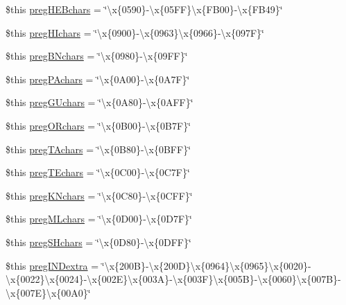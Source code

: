 \begin{DoxyCompactItemize}
\item 
\$this \hyperlink{config_8php_a92662e0d06763e04a021074b8e0dccc2}{preg\-H\-E\-Bchars} = \char`\"{}\textbackslash{}x\{0590\}-\/\textbackslash{}x\{05\-F\-F\}\textbackslash{}x\{\-F\-B00\}-\/\textbackslash{}x\{\-F\-B49\}\char`\"{}
\item 
\$this \hyperlink{config_8php_af9d1185f7f9a284b1bb407f220f10912}{preg\-H\-Ichars} = \char`\"{}\textbackslash{}x\{0900\}-\/\textbackslash{}x\{0963\}\textbackslash{}x\{0966\}-\/\textbackslash{}x\{097\-F\}\char`\"{}
\item 
\$this \hyperlink{config_8php_a5276bdce17f86fd954eb512508901903}{preg\-B\-Nchars} = \char`\"{}\textbackslash{}x\{0980\}-\/\textbackslash{}x\{09\-F\-F\}\char`\"{}
\item 
\$this \hyperlink{config_8php_abd3a4a038f2da6ab7190a76e73dade23}{preg\-P\-Achars} = \char`\"{}\textbackslash{}x\{0\-A00\}-\/\textbackslash{}x\{0\-A7\-F\}\char`\"{}
\item 
\$this \hyperlink{config_8php_aeb71e95cd3fc9cb0d521cb736f6cc137}{preg\-G\-Uchars} = \char`\"{}\textbackslash{}x\{0\-A80\}-\/\textbackslash{}x\{0\-A\-F\-F\}\char`\"{}
\item 
\$this \hyperlink{config_8php_a7758a0c88e02187ea13988e4d88a28a0}{preg\-O\-Rchars} = \char`\"{}\textbackslash{}x\{0\-B00\}-\/\textbackslash{}x\{0\-B7\-F\}\char`\"{}
\item 
\$this \hyperlink{config_8php_aebe9e5d87e50adfe03eaf2b5c938ba7f}{preg\-T\-Achars} = \char`\"{}\textbackslash{}x\{0\-B80\}-\/\textbackslash{}x\{0\-B\-F\-F\}\char`\"{}
\item 
\$this \hyperlink{config_8php_ac9ea40a17f92c27a2ac82e45d2d64844}{preg\-T\-Echars} = \char`\"{}\textbackslash{}x\{0\-C00\}-\/\textbackslash{}x\{0\-C7\-F\}\char`\"{}
\item 
\$this \hyperlink{config_8php_ae099457fad0f1be48f506cfb45a75da2}{preg\-K\-Nchars} = \char`\"{}\textbackslash{}x\{0\-C80\}-\/\textbackslash{}x\{0\-C\-F\-F\}\char`\"{}
\item 
\$this \hyperlink{config_8php_a6d1234147d77eeccaf6b9e0d9d1c8d63}{preg\-M\-Lchars} = \char`\"{}\textbackslash{}x\{0\-D00\}-\/\textbackslash{}x\{0\-D7\-F\}\char`\"{}
\item 
\$this \hyperlink{config_8php_a404ba7c2d5ac2fcaee621139c7ef950e}{preg\-S\-Hchars} = \char`\"{}\textbackslash{}x\{0\-D80\}-\/\textbackslash{}x\{0\-D\-F\-F\}\char`\"{}
\item 
\$this \hyperlink{config_8php_aa41611bb95e2193d332ec85b1e20041a}{preg\-I\-N\-Dextra} = \char`\"{}\textbackslash{}x\{200\-B\}-\/\textbackslash{}x\{200\-D\}\textbackslash{}x\{0964\}\textbackslash{}x\{0965\}\textbackslash{}x\{0020\}-\/\textbackslash{}x\{0022\}\textbackslash{}x\{0024\}-\/\textbackslash{}x\{002\-E\}\textbackslash{}x\{003\-A\}-\/\textbackslash{}x\{003\-F\}\textbackslash{}x\{005\-B\}-\/\textbackslash{}x\{0060\}\textbackslash{}x\{007\-B\}-\/\textbackslash{}x\{007\-E\}\textbackslash{}x\{00\-A0\}\char`\"{}

\end{DoxyCompactItemize}

